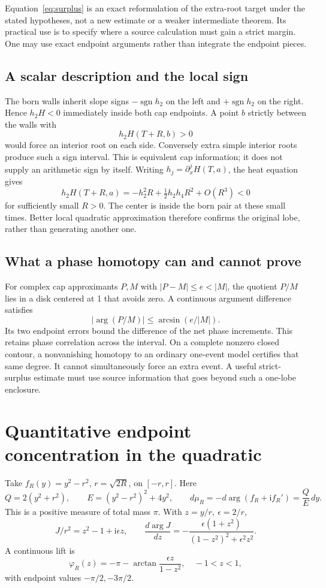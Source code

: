 \documentclass[11pt]{article}
\theoremstyle{definition}
\newcommand{\ii}{\mathrm i}
\newcommand{\sgn}{\operatorname{sgn}}
\begin{document}
Equation~\eqref{eq:surplus} is an exact reformulation of the extra-root
target under the stated hypotheses, not a new estimate or a weaker
intermediate theorem. Its practical use is to specify where a source
calculation must gain a strict margin. One may use exact endpoint
arguments rather than integrate the endpoint pieces.

\subsection{A scalar description and the local sign}
The born walls inherit slope signs
\(-\sgn h_2\) on the left and \(+\sgn h_2\) on the right.
Hence \(h_2H<0\) immediately inside both cap endpoints. A point \(b\)
strictly between the walls with
\begin{equation}
                  h_2H(T+R,b)>0                  \label{eq:sign-target}
\end{equation}
would force an interior root on each side. Conversely extra simple
interior roots produce such a sign interval. This is equivalent cap
information; it does not supply an arithmetic sign by itself.
Writing \(h_j=\partial_x^jH(T,a)\), the heat equation gives
\[
 h_2H(T+R,a)=-h_2^2R+\tfrac12h_2h_4R^2+O(R^3)<0
\]
for sufficiently small \(R>0\). The center is inside the born pair
at these small times. Better local quadratic approximation therefore
confirms the original lobe, rather than generating another one.

\subsection{What a phase homotopy can and cannot prove}
For complex cap approximants \(P,M\) with
\(|P-M|\le e<|M|\), the quotient \(P/M\) lies in a disk centered
at 1 that avoids zero. A continuous argument difference satisfies
\[
 |\arg(P/M)|\le\arcsin(e/|M|).
\]
Its two endpoint errors bound the difference of the net phase increments.
This retains phase correlation across the interval.
On a complete nonzero closed contour, a nonvanishing homotopy to an
ordinary one-event model certifies that same degree. It cannot
simultaneously force an extra event. A useful strict-surplus estimate
must use source information that goes beyond such a one-lobe enclosure.

\section{Quantitative endpoint concentration in the quadratic}
\label{sec:quadratic}
Take \(f_R(y)=y^2-r^2\), \(r=\sqrt{2R}\), on \([-r,r]\).
Here
\[
 Q=2(y^2+r^2),\qquad E=(y^2-r^2)^2+4y^2,\qquad
 d\mu_R=-d\arg(f_R+\ii f_R')=\frac{Q}{E}\,dy.
\]
This is a positive measure of total mass \(\pi\).
With \(z=y/r,\ \epsilon=2/r\),
\begin{equation}
 J/r^2=z^2-1+\ii\epsilon z,\qquad
 \frac{d\arg J}{dz}
 =-\frac{\epsilon(1+z^2)}{(1-z^2)^2+\epsilon^2z^2}. \label{eq:quad-density}
\end{equation}
A continuous lift is
\[
 \varphi_R(z)=-\pi-\arctan\frac{\epsilon z}{1-z^2},
 \quad -1<z<1,
\]
with endpoint values \(-\pi/2,-3\pi/2\).
\end{document}
